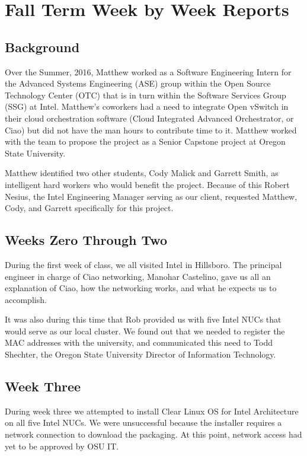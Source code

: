 \documentclass[10pt,onecolumn,journal,draftclsnofoot]{IEEEtran}
\begin{document}
\section{Fall Term Week by Week Reports}

\subsection{Background}

Over the Summer, 2016, Matthew worked as a Software Engineering Intern for the
Advanced Systems Engineering (ASE) group within the Open Source Technology
Center (OTC) that is in turn within the Software Services Group (SSG) at Intel.
Matthew's coworkers had a need to integrate Open vSwitch in their cloud
orchestration software (Cloud Integrated Advanced Orchestrator, or Ciao) but did
not have the man hours to contribute time to it. Matthew worked with the team to
propose the project as a Senior Capstone project at Oregon State University.

Matthew identified two other students, Cody Malick and Garrett Smith, as
intelligent hard workers who would benefit the project. Because of this Robert
Nesius, the Intel Engineering Manager serving as our client, requested Matthew,
Cody, and Garrett specifically for this project.

\subsection{Weeks Zero Through Two}

During the first week of class, we all visited Intel in Hillsboro. The principal
engineer in charge of Ciao networking, Manohar Castelino, gave us all an
explanation of Ciao, how the networking works, and what he expects us to
accomplish.

It was also during this time that Rob provided us with five Intel NUCs that
would serve as our local cluster. We found out that we needed to register the
MAC addresses with the university, and communicated this need to Todd Shechter,
the Oregon State University Director of Information Technology.

\subsection{Week Three}

During week three we attempted to install Clear Linux OS for Intel
Architecture~\cite{clearlinux} on all five Intel NUCs. We were unsuccessful
because the installer requires a network connection to download the packaging.
At this point, network access had yet to be approved by OSU IT.
\end{document}
